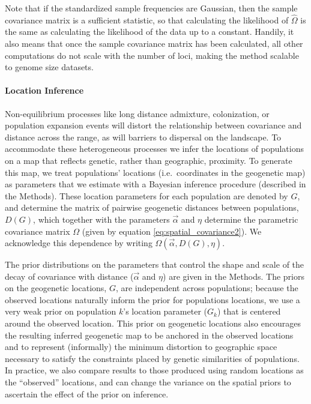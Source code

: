 \documentclass[12pt]{article}
\begin{document}
Note that if the standardized sample frequencies are Gaussian, then the sample covariance matrix is a sufficient statistic,
so that calculating the likelihood of $\widehat \Omega$ is the same as calculating the likelihood of the data up to a constant.
Handily, it also means that once the sample covariance matrix has been calculated, 
all other computations do not scale with the number of loci, making the method scalable to genome size datasets. 

\paragraph{Location Inference} 
Non-equilibrium processes like long distance admixture, colonization, or population expansion events will distort the relationship between covariance and distance across the range, as will barriers to dispersal on the landscape. To accommodate these heterogeneous processes we infer the locations of populations on a map that reflects genetic, rather than geographic, proximity.  
To generate this map, we treat populations' locations (i.e.\ coordinates in the geogenetic map)
as parameters that we estimate
with a Bayesian inference procedure (described in the Methods).
These location parameters for each population are denoted by $G$,
and determine the matrix of pairwise geogenetic distances between populations, $D(G)$,
which together with the parameters $\vec{\alpha}$ and $\eta$ determine
the parametric covariance matrix $\Omega$ (given by equation \eqref{eq:spatial_covariance2}).
We acknowledge this dependence by writing $\Omega(\vec{\alpha},{D}(G),\eta)$.  

The prior distributions on the parameters that control the shape and scale of the decay of covariance with distance ($\vec{\alpha}$ and $\eta$) are given in the Methods.
The priors on the geogenetic locations, $G$, are independent across populations;  
because the observed locations naturally inform the prior for populations locations, 
we use a very weak prior on population $k$'s location parameter ($G_k$) that is centered around the observed location.
This prior on geogenetic locations
also encourages the resulting inferred geogenetic map to be anchored in the observed locations 
and to represent (informally) the minimum distortion to geographic space necessary to satisfy the constraints placed by genetic similarities of populations.  
In practice, we also compare results to those produced using random locations as the ``observed'' locations, 
and can change the variance on the spatial priors to ascertain the effect of the prior on inference. 
\end{document}
